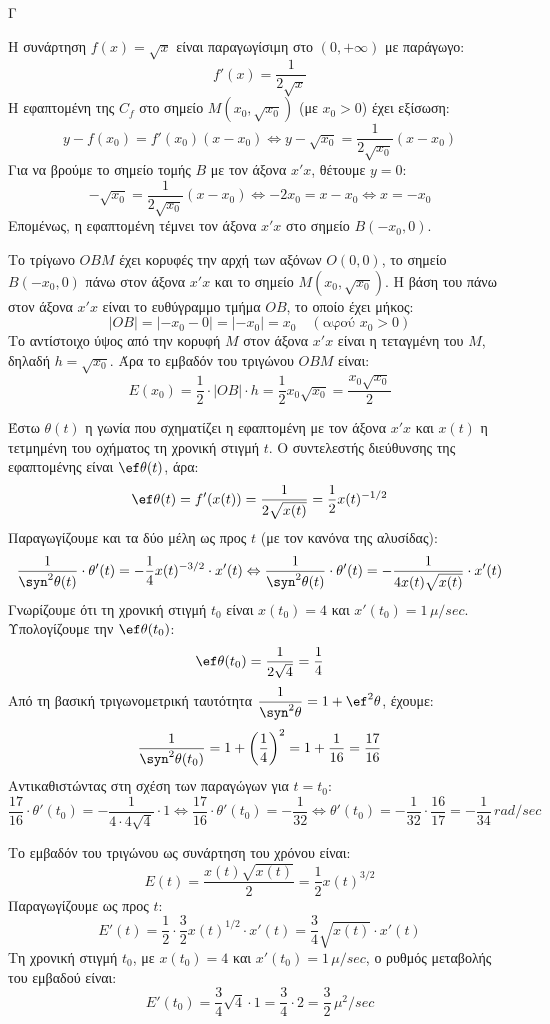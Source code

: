 \begin{thema}{Γ}
\begin{erwthma}
\item Η συνάρτηση $f(x)=\sqrt{x}$ είναι παραγωγίσιμη στο $(0,+\infty)$ με παράγωγο:
\[f'(x)=\frac{1}{2\sqrt{x}}\]
Η εφαπτομένη της $C_f$ στο σημείο $M(x_0,\sqrt{x_0})$ (με $x_0>0$) έχει εξίσωση:
\[y-f(x_0)=f'(x_0)(x-x_0) \Leftrightarrow y-\sqrt{x_0}=\frac{1}{2\sqrt{x_0}}(x-x_0)\]
Για να βρούμε το σημείο τομής $B$ με τον άξονα $x'x$, θέτουμε $y=0$:
\[-\sqrt{x_0}=\frac{1}{2\sqrt{x_0}}(x-x_0) \Leftrightarrow -2x_0=x-x_0 \Leftrightarrow x=-x_0\]
Επομένως, η εφαπτομένη τέμνει τον άξονα $x'x$ στο σημείο $B(-x_0,0)$.

\item Το τρίγωνο $OBM$ έχει κορυφές την αρχή των αξόνων $O(0,0)$, το σημείο $B(-x_0,0)$ πάνω στον άξονα $x'x$ και το σημείο $M(x_0,\sqrt{x_0})$.
Η βάση του πάνω στον άξονα $x'x$ είναι το ευθύγραμμο τμήμα $OB$, το οποίο έχει μήκος:
\[|OB| = |-x_0 - 0| = |-x_0| = x_0 \quad (\text{αφού } x_0>0)\]
Το αντίστοιχο ύψος από την κορυφή $M$ στον άξονα $x'x$ είναι η τεταγμένη του $M$, δηλαδή $h = \sqrt{x_0}$.
Άρα το εμβαδόν του τριγώνου $OBM$ είναι:
\[E(x_0)=\frac{1}{2}\cdot|OB|\cdot h = \frac{1}{2}x_0\sqrt{x_0} = \frac{x_0\sqrt{x_0}}{2}\]

\item Έστω $\theta(t)$ η γωνία που σχηματίζει η εφαπτομένη με τον άξονα $x'x$ και $x(t)$ η τετμημένη του οχήματος τη χρονική στιγμή $t$. Ο συντελεστής διεύθυνσης της εφαπτομένης είναι $\ef\theta(t)$, άρα:
\[\ef\theta(t)=f'(x(t))=\frac{1}{2\sqrt{x(t)}}=\frac{1}{2}x(t)^{-1/2}\]
Παραγωγίζουμε και τα δύο μέλη ως προς $t$ (με τον κανόνα της αλυσίδας):
\[\frac{1}{\syn^2\theta(t)}\cdot\theta'(t)=-\frac{1}{4}x(t)^{-3/2}\cdot x'(t) \Leftrightarrow \frac{1}{\syn^2\theta(t)}\cdot\theta'(t)=-\frac{1}{4x(t)\sqrt{x(t)}}\cdot x'(t)\]
Γνωρίζουμε ότι τη χρονική στιγμή $t_0$ είναι $x(t_0)=4$ και $x'(t_0)=1\,\mu/\si{sec}$. Υπολογίζουμε την $\ef\theta(t_0)$:
\[\ef\theta(t_0)=\frac{1}{2\sqrt{4}}=\frac{1}{4}\]
Από τη βασική τριγωνομετρική ταυτότητα $\dfrac{1}{\syn^2\theta}=1+\ef^2\theta$, έχουμε:
\[\frac{1}{\syn^2\theta(t_0)}=1+\left(\frac{1}{4}\right)^2=1+\frac{1}{16}=\frac{17}{16}\]
Αντικαθιστώντας στη σχέση των παραγώγων για $t=t_0$:
\[\frac{17}{16}\cdot\theta'(t_0)=-\frac{1}{4\cdot 4\sqrt{4}}\cdot 1 \Leftrightarrow \frac{17}{16}\cdot\theta'(t_0)=-\frac{1}{32} \Leftrightarrow \theta'(t_0)=-\frac{1}{32}\cdot\frac{16}{17}=-\frac{1}{34}\,\si{rad/sec}\]

\item Το εμβαδόν του τριγώνου ως συνάρτηση του χρόνου είναι:
\[E(t)=\frac{x(t)\sqrt{x(t)}}{2}=\frac{1}{2}x(t)^{3/2}\]
Παραγωγίζουμε ως προς $t$:
\[E'(t)=\frac{1}{2}\cdot\frac{3}{2}x(t)^{1/2}\cdot x'(t)=\frac{3}{4}\sqrt{x(t)}\cdot x'(t)\]
Τη χρονική στιγμή $t_0$, με $x(t_0)=4$ και $x'(t_0)=1\,\mu/\si{sec}$, ο ρυθμός μεταβολής του εμβαδού είναι:
\[E'(t_0)=\frac{3}{4}\sqrt{4}\cdot 1=\frac{3}{4}\cdot 2=\frac{3}{2}\,\mu^2/\si{sec}\]
\end{erwthma}
\end{thema}

